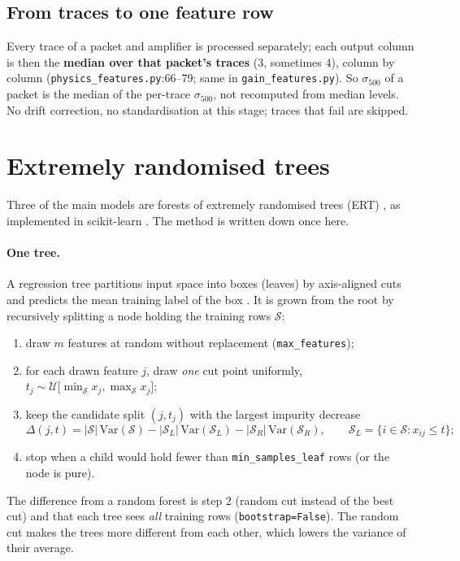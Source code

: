 \documentclass[10pt,a4paper]{article}
\newcommand{\code}[1]{\texttt{\small #1}}
\begin{document}
\subsection{From traces to one feature row}
Every trace of a packet and amplifier is processed separately; each output column is then the \textbf{median over that
packet's traces} (3, sometimes 4), column by column (\code{physics\_features.py}:66--79; same in \code{gain\_features.py}).
So $\sigma_{500}$ of a packet is the median of the per-trace $\sigma_{500}$, not recomputed from median levels.
No drift correction, no standardisation at this stage; traces that fail are skipped.

\section{Extremely randomised trees}\label{sec:ert}

Three of the main models are forests of extremely randomised trees (ERT) \cite{geurts2006}, as implemented in scikit-learn
\cite{pedregosa2011}. The method is written down once here.

\paragraph{One tree.} A regression tree partitions input space into boxes (leaves) by axis-aligned cuts and predicts the
mean training label of the box \cite{breiman1984}. It is grown from the root by recursively splitting a node holding the
training rows $\mathcal S$:
\begin{enumerate}
\item draw $m$ features at random without replacement (\code{max\_features});
\item for each drawn feature $j$, draw \emph{one} cut point uniformly, $t_j\sim\mathcal U\big[\min_{\mathcal S}x_j,\max_{\mathcal S}x_j\big]$;
\item keep the candidate split $(j,t_j)$ with the largest impurity decrease
\begin{equation}
\Delta(j,t)=|\mathcal S|\,\mathrm{Var}(\mathcal S)-|\mathcal S_L|\,\mathrm{Var}(\mathcal S_L)-|\mathcal S_R|\,\mathrm{Var}(\mathcal S_R),
\qquad \mathcal S_L=\{i\in\mathcal S:x_{ij}\le t\};
\end{equation}
\item stop when a child would hold fewer than \code{min\_samples\_leaf} rows (or the node is pure).
\end{enumerate}
The difference from a random forest \cite{breiman2001} is step 2 (random cut instead of the best cut) and that each tree
sees \emph{all} training rows (\code{bootstrap=False}). The random cut makes the trees more different from each other,
which lowers the variance of their average.
\end{document}
